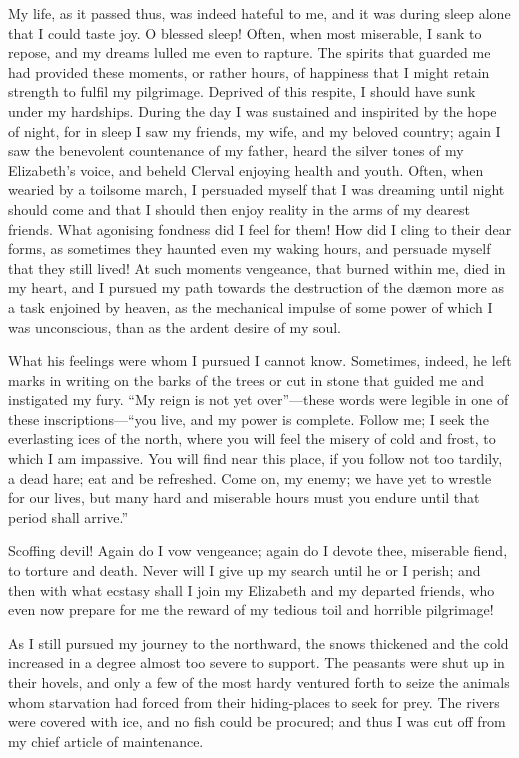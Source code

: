 \documentclass[12pt,openright]{book}
\begin{document}
My life, as it passed thus, was indeed hateful to me, and it was during sleep alone that I could taste joy. O blessed sleep! Often, when most miserable, I sank to repose, and my dreams lulled me even to rapture. The spirits that guarded me had provided these moments, or rather hours, of happiness that I might retain strength to fulfil my pilgrimage. Deprived of this respite, I should have sunk under my hardships. During the day I was sustained and inspirited by the hope of night, for in sleep I saw my friends, my wife, and my beloved country; again I saw the benevolent countenance of my father, heard the silver tones of my Elizabeth’s voice, and beheld Clerval enjoying health and youth. Often, when wearied by a toilsome march, I persuaded myself that I was dreaming until night should come and that I should then enjoy reality in the arms of my dearest friends. What agonising fondness did I feel for them! How did I cling to their dear forms, as sometimes they haunted even my waking hours, and persuade myself that they still lived! At such moments vengeance, that burned within me, died in my heart, and I pursued my path towards the destruction of the dæmon more as a task enjoined by heaven, as the mechanical impulse of some power of which I was unconscious, than as the ardent desire of my soul.

What his feelings were whom I pursued I cannot know. Sometimes, indeed, he left marks in writing on the barks of the trees or cut in stone that guided me and instigated my fury. “My reign is not yet over”—these words were legible in one of these inscriptions—“you live, and my power is complete. Follow me; I seek the everlasting ices of the north, where you will feel the misery of cold and frost, to which I am impassive. You will find near this place, if you follow not too tardily, a dead hare; eat and be refreshed. Come on, my enemy; we have yet to wrestle for our lives, but many hard and miserable hours must you endure until that period shall arrive.”

Scoffing devil! Again do I vow vengeance; again do I devote thee, miserable fiend, to torture and death. Never will I give up my search until he or I perish; and then with what ecstasy shall I join my Elizabeth and my departed friends, who even now prepare for me the reward of my tedious toil and horrible pilgrimage!

As I still pursued my journey to the northward, the snows thickened and the cold increased in a degree almost too severe to support. The peasants were shut up in their hovels, and only a few of the most hardy ventured forth to seize the animals whom starvation had forced from their hiding-places to seek for prey. The rivers were covered with ice, and no fish could be procured; and thus I was cut off from my chief article of maintenance.
\end{document}
